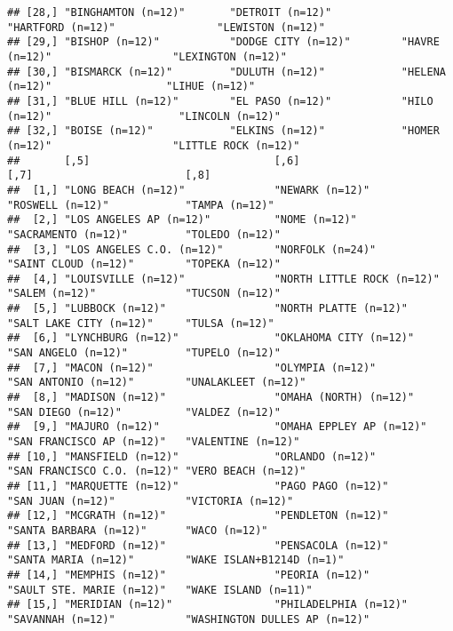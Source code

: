 \documentclass[
]{book}
\begin{document}
\begin{verbatim}
## [28,] "BINGHAMTON (n=12)"       "DETROIT (n=12)"           "HARTFORD (n=12)"                "LEWISTON (n=12)"           
## [29,] "BISHOP (n=12)"           "DODGE CITY (n=12)"        "HAVRE (n=12)"                   "LEXINGTON (n=12)"          
## [30,] "BISMARCK (n=12)"         "DULUTH (n=12)"            "HELENA (n=12)"                  "LIHUE (n=12)"              
## [31,] "BLUE HILL (n=12)"        "EL PASO (n=12)"           "HILO (n=12)"                    "LINCOLN (n=12)"            
## [32,] "BOISE (n=12)"            "ELKINS (n=12)"            "HOMER (n=12)"                   "LITTLE ROCK (n=12)"        
##       [,5]                             [,6]                       [,7]                        [,8]                         
##  [1,] "LONG BEACH (n=12)"              "NEWARK (n=12)"            "ROSWELL (n=12)"            "TAMPA (n=12)"               
##  [2,] "LOS ANGELES AP (n=12)"          "NOME (n=12)"              "SACRAMENTO (n=12)"         "TOLEDO (n=12)"              
##  [3,] "LOS ANGELES C.O. (n=12)"        "NORFOLK (n=24)"           "SAINT CLOUD (n=12)"        "TOPEKA (n=12)"              
##  [4,] "LOUISVILLE (n=12)"              "NORTH LITTLE ROCK (n=12)" "SALEM (n=12)"              "TUCSON (n=12)"              
##  [5,] "LUBBOCK (n=12)"                 "NORTH PLATTE (n=12)"      "SALT LAKE CITY (n=12)"     "TULSA (n=12)"               
##  [6,] "LYNCHBURG (n=12)"               "OKLAHOMA CITY (n=12)"     "SAN ANGELO (n=12)"         "TUPELO (n=12)"              
##  [7,] "MACON (n=12)"                   "OLYMPIA (n=12)"           "SAN ANTONIO (n=12)"        "UNALAKLEET (n=12)"          
##  [8,] "MADISON (n=12)"                 "OMAHA (NORTH) (n=12)"     "SAN DIEGO (n=12)"          "VALDEZ (n=12)"              
##  [9,] "MAJURO (n=12)"                  "OMAHA EPPLEY AP (n=12)"   "SAN FRANCISCO AP (n=12)"   "VALENTINE (n=12)"           
## [10,] "MANSFIELD (n=12)"               "ORLANDO (n=12)"           "SAN FRANCISCO C.O. (n=12)" "VERO BEACH (n=12)"          
## [11,] "MARQUETTE (n=12)"               "PAGO PAGO (n=12)"         "SAN JUAN (n=12)"           "VICTORIA (n=12)"            
## [12,] "MCGRATH (n=12)"                 "PENDLETON (n=12)"         "SANTA BARBARA (n=12)"      "WACO (n=12)"                
## [13,] "MEDFORD (n=12)"                 "PENSACOLA (n=12)"         "SANTA MARIA (n=12)"        "WAKE ISLAN+B1214D (n=1)"    
## [14,] "MEMPHIS (n=12)"                 "PEORIA (n=12)"            "SAULT STE. MARIE (n=12)"   "WAKE ISLAND (n=11)"         
## [15,] "MERIDIAN (n=12)"                "PHILADELPHIA (n=12)"      "SAVANNAH (n=12)"           "WASHINGTON DULLES AP (n=12)"

\end{verbatim}
\end{document}
